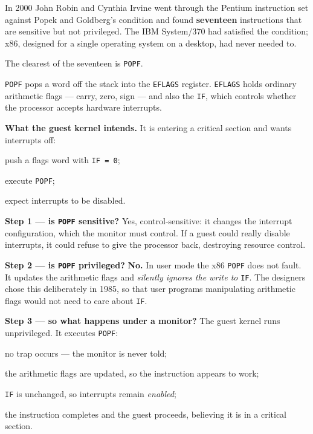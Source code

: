 In 2000 John Robin and Cynthia Irvine went through the Pentium instruction set
against Popek and Goldberg's condition and found \textbf{seventeen}
instructions that are sensitive but not privileged. The IBM System/370 had
satisfied the condition; x86, designed for a single operating system on a
desktop, had never needed to.

The clearest of the seventeen is \texttt{POPF}.

\begin{worked}
\texttt{POPF} pops a word off the stack into the \texttt{EFLAGS} register.
\texttt{EFLAGS} holds ordinary arithmetic flags --- carry, zero, sign --- and
also the  \texttt{IF}, which controls whether the processor
accepts hardware interrupts.

\smallskip
\textbf{What the guest kernel intends.} It is entering a critical section and
wants interrupts off:
\begin{tight}
  \item push a flags word with \texttt{IF = 0};
  \item execute \texttt{POPF};
  \item expect interrupts to be disabled.
\end{tight}

\smallskip
\textbf{Step 1 --- is \texttt{POPF} sensitive?} Yes, control-sensitive: it
changes the interrupt configuration, which the monitor must control. If a guest
could really disable interrupts, it could refuse to give the processor back,
destroying resource control.

\smallskip
\textbf{Step 2 --- is \texttt{POPF} privileged?} \textbf{No.} In user mode the
x86 \texttt{POPF} does not fault. It updates the arithmetic flags and
\emph{silently ignores the write to} \texttt{IF}. The designers chose this
deliberately in 1985, so that user programs manipulating arithmetic flags would
not need to care about \texttt{IF}.

\smallskip
\textbf{Step 3 --- so what happens under a monitor?} The guest kernel runs
unprivileged. It executes \texttt{POPF}:
\begin{tight}
  \item no trap occurs --- the monitor is never told;
  \item the arithmetic flags are updated, so the instruction appears to work;
  \item \texttt{IF} is unchanged, so interrupts remain \emph{enabled};
  \item the instruction completes and the guest proceeds, believing it is in a
        critical section.
\end{tight}


\end{worked}
